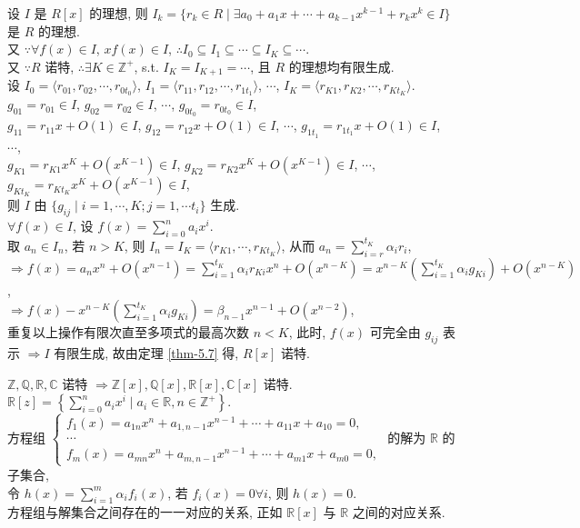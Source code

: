 \documentclass{note}
\begin{document}
\begin{pf}
    设 $I$ 是 $R[x]$ 的理想, 则 $I_k=\{r_k\in R\mid\exists a_0+a_1x+\cdots+a_{k-1}x^{k-1}+r_kx^k\in I\}$ 是 $R$ 的理想.\\
    又 $\because\forall f(x)\in I$, $xf(x)\in I$, $\therefore I_0\subseteq I_1\subseteq\cdots\subseteq I_K\subseteq\cdots$.\\
    又 $\because R$ 诺特, $\therefore\exists K\in\mathbb{Z}^+$, s.t. $I_K=I_{K+1}=\cdots$, 且 $R$ 的理想均有限生成.\\
    设 $I_0=\langle r_{01},r_{02},\cdots,r_{0t_0}\rangle$, $I_1=\langle r_{11},r_{12},\cdots,r_{1t_1}\rangle$, $\cdots$, $I_K=\langle r_{K1},r_{K2},\cdots,r_{Kt_K}\rangle$.\\
    $g_{01}=r_{01}\in I$, $g_{02}=r_{02}\in I$, $\cdots$, $g_{0t_0}=r_{0t_0}\in I$,\\
    $g_{11}=r_{11}x+O(1)\in I$, $g_{12}=r_{12}x+O(1)\in I$, $\cdots$, $g_{1t_1}=r_{1t_1}x+O(1)\in I$,\\
    $\cdots$,\\
    $g_{K1}=r_{K1}x^K+O(x^{K-1})\in I$, $g_{K2}=r_{K2}x^K+O(x^{K-1})\in I$, $\cdots$, $g_{Kt_K}=r_{Kt_K}x^K+O(x^{K-1})\in I$,\\
    则 $I$ 由 $\{g_{ij}\mid i=1,\cdots,K;j=1,\cdots t_i\}$ 生成.\\
    $\forall f(x)\in I$, 设 $f(x)=\sum_{i=0}^na_ix^i$.\\
    取 $a_n\in I_n$, 若 $n>K$, 则 $I_n=I_K=\langle r_{K1},\cdots,r_{Kt_K}\rangle$, 从而 $a_n=\sum_{i=r}^{t_K}\alpha_ir_i$,\\
    $\Longrightarrow f(x)=a_nx^n+O(x^{n-1})=\sum_{i=1}^{t_K}\alpha_ir_{Ki}x^n+O(x^{n-K})=x^{n-K}\left(\sum_{i=1}^{t_K}\alpha_ig_{Ki}\right)+O(x^{n-K})$,\\
    $\Longrightarrow f(x)-x^{n-K}\left(\sum_{i=1}^{t_K}\alpha_ig_{Ki}\right)=\beta_{n-1}x^{n-1}+O(x^{n-2})$,\\
    重复以上操作有限次直至多项式的最高次数 $n<K$, 此时, $f(x)$ 可完全由 $g_{ij}$ 表示 $\Longrightarrow I$ 有限生成, 故由定理 \ref{thm-5.7} 得, $R[x]$ 诺特.
\end{pf}

\begin{eg}
    $\mathbb{Z},\mathbb{Q},\mathbb{R},\mathbb{C}$ 诺特 $\Longrightarrow\mathbb{Z}[x],\mathbb{Q}[x],\mathbb{R}[x],\mathbb{C}[x]$ 诺特.\\
    $\mathbb{R}[z]=\left\{\sum_{i=0}^na_ix^i\mid a_i\in\mathbb{R},n\in\mathbb{Z}^+\right\}$.\\
    方程组 $\left\{\begin{array}{l}
        f_1(x)=a_{1n}x^n+a_{1,n-1}x^{n-1}+\cdots+a_{11}x+a_{10}=0,\\
        \cdots\\
        f_m(x)=a_{mn}x^n+a_{m,n-1}x^{n-1}+\cdots+a_{m1}x+a_{m0}=0,
    \end{array}\right.$ 的解为 $\mathbb{R}$ 的子集合,\\
    令 $h(x)=\sum_{i=1}^m\alpha_if_i(x)$, 若 $f_i(x)=0\forall i$, 则 $h(x)=0$.\\
    方程组与解集合之间存在的一一对应的关系, 正如 $\mathbb{R}[x]$ 与 $\mathbb{R}$ 之间的对应关系.
\end{eg}
\ifx\allfiles\undefined
\end{document}
